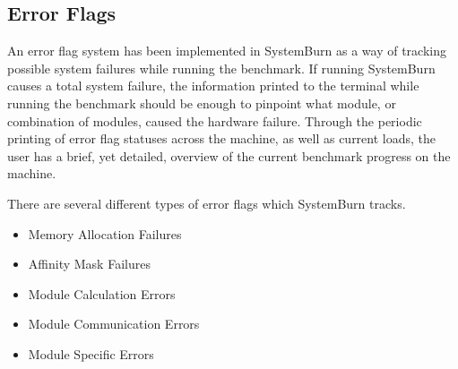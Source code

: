 \subsection{Error Flags}

An error flag system has been implemented in SystemBurn as a way of tracking possible system failures while running the benchmark. If running SystemBurn causes a total system failure, the information printed to the terminal while running the benchmark should be enough to pinpoint what module, or combination of modules, caused the hardware failure. Through the periodic printing of error flag statuses across the machine, as well as current loads, the user has a brief, yet detailed, overview of the current benchmark progress on the machine. 

There are several different types of error flags which SystemBurn tracks. 
\begin{itemize}
	\item Memory Allocation Failures
	\item Affinity Mask Failures
	\item Module Calculation Errors
	\item Module Communication Errors
	\item Module Specific Errors
\end{itemize} 
